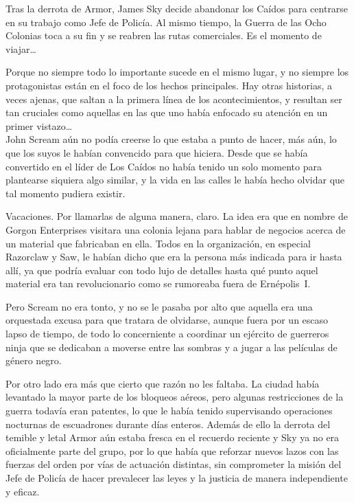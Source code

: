 \begin{prev}
    Tras la derrota de Armor, James Sky decide abandonar los Caídos para centrarse en su trabajo como Jefe de Policía. Al mismo tiempo, la Guerra de las Ocho Colonias toca a su fin y se reabren las rutas comerciales. Es el momento de viajar\dots
\end{prev}

\noindent{}Porque no siempre todo lo importante sucede en el mismo lugar, y no siempre los protagonistas están en el foco de los hechos principales. Hay otras historias, a veces ajenas, que saltan a la primera línea de los acontecimientos, y resultan ser tan cruciales como aquellas en las que uno había enfocado su atención en un primer vistazo\dots\\

\noindent{}John Scream aún no podía creerse lo que estaba a punto de hacer, más aún, lo que los suyos le habían convencido para que hiciera. Desde que se había convertido en el líder de Los Caídos no había tenido un solo momento para plantearse siquiera algo similar, y la vida en las calles le había hecho olvidar que tal momento pudiera existir.

Vacaciones. Por llamarlas de alguna manera, claro. La idea era que en nombre de Gorgon Enterprises visitara una colonia lejana para hablar de negocios acerca de un material que fabricaban en ella. Todos en la organización, en especial Razorclaw y Saw, le habían dicho que era la persona más indicada para ir hasta allí, ya que podría evaluar con todo lujo de detalles hasta qué punto aquel material era tan revolucionario como se rumoreaba fuera de Ernépolis~I.

Pero Scream no era tonto, y no se le pasaba por alto que aquella era una orquestada excusa para que tratara de olvidarse, aunque fuera por un escaso lapso de tiempo, de todo lo concerniente a coordinar un ejército de guerreros ninja que se dedicaban a moverse entre las sombras y a jugar a las películas de género negro.

Por otro lado era más que cierto que razón no les faltaba. La ciudad había levantado la mayor parte de los bloqueos aéreos, pero algunas restricciones de la guerra todavía eran patentes, lo que le había tenido supervisando operaciones nocturnas de escuadrones durante días enteros. Además de ello la derrota del temible y letal Armor aún estaba fresca en el recuerdo reciente y Sky ya no era oficialmente parte del grupo, por lo que había que reforzar nuevos lazos con las fuerzas del orden por vías de actuación distintas, sin comprometer la misión del Jefe de Policía de hacer prevalecer las leyes y la justicia de manera independiente y eficaz.

